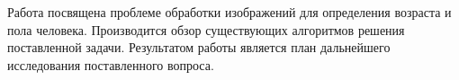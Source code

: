 \Referat

Работа посвящена проблеме обработки изображений для определения возраста и пола
человека. Производится обзор существующих алгоритмов решения поставленной
задачи. Результатом работы является план дальнейшего исследования поставленного
вопроса.


